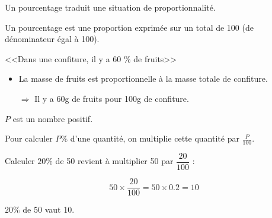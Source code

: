 \documentclass[12pt,a4paper]{article}
\begin{document}

\begin{mydef}
	Un pourcentage traduit une situation de proportionnalité. 

	Un pourcentage est une proportion exprimée sur un total de 100 (de dénominateur égal à 100).
	
\end{mydef}

\begin{myex}
	<<Dans une confiture, il y a 60 \% de fruits>>
	\begin{itemize}
		\item La masse de fruits est proportionnelle à la masse totale de confiture.
		\item[$\Rightarrow$] Il y a 60g de fruits pour 100g de confiture.
	\end{itemize}
\end{myex}


\begin{myprop}
	$P$ est un nombre positif.
	
	Pour calculer $P\% $ d'une quantité, on multiplie cette quantité par $\frac{P}{100}$.
\end{myprop}


\begin{myex}
	Calculer $20 \% $ de 50 revient à multiplier 50 par $\dfrac{20}{100}$ :
	
	\begin{equation*}
		50 \times \dfrac{20}{100} = 50 \times \num{0.2} = 10
	\end{equation*}
	
	
	$20 \% $ de 50  vaut 10.
\end{myex}
\end{document}
